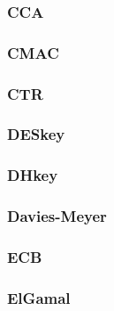 \begin{frame}\frametitle{CCA}
\begin{figure}
\begin{center}

\end{center}
\end{figure}
\end{frame}
\begin{frame}\frametitle{CMAC}
\begin{figure}
\begin{center}

\end{center}
\end{figure}
\end{frame}
\begin{frame}\frametitle{CTR}
\begin{figure}
\begin{center}

\end{center}
\end{figure}
\end{frame}
\begin{frame}\frametitle{DESkey}
\begin{figure}
\begin{center}

\end{center}
\end{figure}
\end{frame}
\begin{frame}\frametitle{DHkey}
\begin{figure}
\begin{center}

\end{center}
\end{figure}
\end{frame}
\begin{frame}\frametitle{Davies-Meyer}
\begin{figure}
\begin{center}

\end{center}
\end{figure}
\end{frame}
\begin{frame}\frametitle{ECB}
\begin{figure}
\begin{center}

\end{center}
\end{figure}
\end{frame}
\begin{frame}\frametitle{ElGamal}
\begin{figure}
\begin{center}

\end{center}
\end{figure}
\end{frame}
